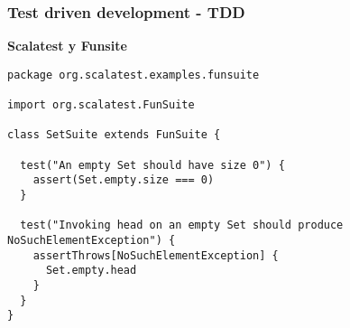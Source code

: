 \documentclass{beamer}
\begin{document}
\begin{frame}[fragile]
\frametitle{Test driven development - TDD }
\textbf{Scalatest y Funsite}

\begin{example}
\begin{tiny}\fontsize{7}{8}\selectfont
\begin{verbatim}
package org.scalatest.examples.funsuite

import org.scalatest.FunSuite

class SetSuite extends FunSuite {

  test("An empty Set should have size 0") {
    assert(Set.empty.size === 0)
  }

  test("Invoking head on an empty Set should produce NoSuchElementException") {
    assertThrows[NoSuchElementException] {
      Set.empty.head
    }
  }
}
\end{verbatim}\end{tiny}
\end{example}
\end{frame}
\end{document}
